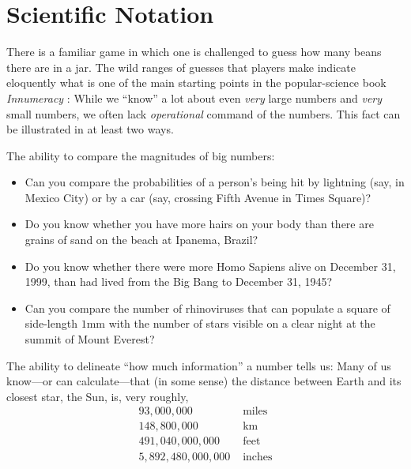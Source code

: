 \section{Scientific Notation}
\label{sec:scientific-notation}

There is a familiar game in which one is challenged to guess how many
beans there are in a jar. The wild ranges of guesses that players make
indicate eloquently what is one of the main starting points in the
popular-science book {\it Innumeracy} \cite{Paulos}: While we ``know''
a lot about even {\em very} large numbers and {\em very} small
numbers, we often lack {\em operational} command of the numbers.  This
fact can be illustrated in at least two ways.

The ability to compare the magnitudes of big numbers:
\begin{itemize}
\item
Can you compare the probabilities of a person's being hit by lightning
(say, in Mexico City) or by a car (say, crossing Fifth Avenue in Times
Square)?
\item
Do you know whether you have more hairs on your body than there are
grains of sand on the beach at Ipanema, Brazil?
\item

Do you know whether there were more Homo Sapiens alive on December 31,
1999, than had lived from the Big Bang to December 31, 1945?
\item
Can you compare the number of rhinoviruses that can populate a square
of side-length $1$mm with the number of stars visible on a clear night
at the summit of Mount Everest?
\end{itemize}

The ability to delineate ``how much information'' a number tells us:
Many of us know---or can calculate---that (in some sense) the distance
between Earth and its closest star, the Sun, is, very roughly,
\[ \begin{array}{rl}
93,000,000 & \mbox{ miles} \\
148,800,000 & \mbox{ km} \\
491,040,000,000 & \mbox{ feet} \\
5,892,480,000,000 & \mbox{ inches}
\end{array}
\]

\medskip

\noindent {}

